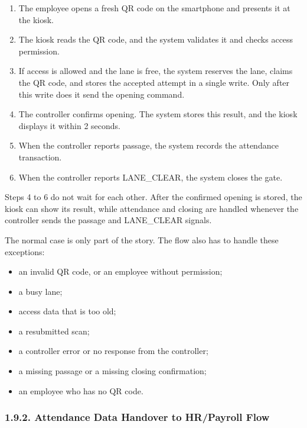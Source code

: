 \begin{enumerate}[leftmargin=36pt, itemsep=2pt, topsep=4pt, parsep=2pt]
  \item The employee opens a fresh QR code on the smartphone and presents it at the kiosk.
  \item The kiosk reads the QR code, and the system validates it and checks access permission.
  \item If access is allowed and the lane is free, the system reserves the lane, claims the QR code, and stores the accepted attempt in a single write. Only after this write does it send the opening command.
  \item The controller confirms opening. The system stores this result, and the kiosk displays it within 2 seconds.
  \item When the controller reports passage, the system records the attendance transaction.
  \item When the controller reports LANE\_CLEAR, the system closes the gate.
\end{enumerate}

Steps 4 to 6 do not wait for each other. After the confirmed opening is stored, the kiosk can show its result, while attendance and closing are handled whenever the controller sends the passage and LANE\_CLEAR signals.

The normal case is only part of the story. The flow also has to handle these exceptions:

\begin{itemize}[leftmargin=36pt, itemsep=2pt, topsep=4pt, parsep=2pt]
  \item an invalid QR code, or an employee without permission;
  \item a busy lane;
  \item access data that is too old;
  \item a resubmitted scan;
  \item a controller error or no response from the controller;
  \item a missing passage or a missing closing confirmation;
  \item an employee who has no QR code.
\end{itemize}

\subsubsection*{1.9.2. Attendance Data Handover to HR/Payroll Flow}

